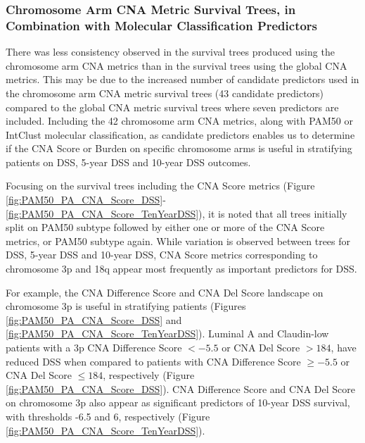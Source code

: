 \subsubsection{Chromosome Arm CNA Metric Survival Trees, in Combination with Molecular Classification Predictors}
There was less consistency observed in the survival trees produced using the chromosome arm CNA metrics than in the survival trees using the global CNA metrics. This may be due to the increased number of candidate predictors used in the chromosome arm CNA metric survival trees (43 candidate predictors) compared to the global CNA metric survival trees where seven predictors are included. Including the 42 chromosome arm CNA metrics, along with PAM50 or IntClust molecular classification, as candidate predictors enables us to determine if the CNA Score or Burden on specific chromosome arms is useful in stratifying patients on DSS, 5-year DSS and 10-year DSS outcomes.  

Focusing on the survival trees including the CNA Score metrics (Figure \ref{fig:PAM50_PA_CNA_Score_DSS}-\ref{fig:PAM50_PA_CNA_Score_TenYearDSS}), it is noted that all trees initially split on PAM50 subtype followed by either one or more of the CNA Score metrics, or PAM50 subtype again. While variation is observed between trees for DSS, 5-year DSS and 10-year DSS, CNA Score metrics corresponding to chromosome 3p and 18q appear most frequently as important predictors for DSS. 

For example, the CNA Difference Score and CNA Del Score landscape on chromosome 3p is useful in stratifying patients (Figures \ref{fig:PAM50_PA_CNA_Score_DSS} and \ref{fig:PAM50_PA_CNA_Score_TenYearDSS}). Luminal A and Claudin-low patients with a 3p CNA Difference Score $<-5.5$ or CNA Del Score $>184$, have reduced DSS when compared to patients with CNA Difference Score $\geq -5.5$ or CNA Del Score $\leq 184$, respectively (Figure \ref{fig:PAM50_PA_CNA_Score_DSS}). CNA Difference Score and CNA Del Score on chromosome 3p also appear as significant predictors of 10-year DSS survival, with thresholds -6.5 and 6, respectively (Figure \ref{fig:PAM50_PA_CNA_Score_TenYearDSS}). 

